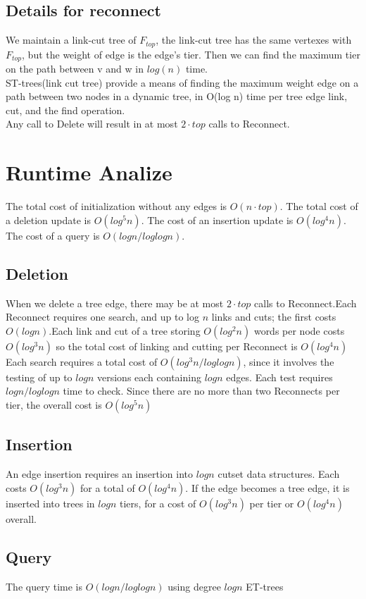 \documentclass[conference,compsoc]{IEEEtran}
\begin{document}
\subsection{Details for reconnect}
We maintain a link-cut tree of $F_{top}$, the link-cut tree has the same vertexes with $F_{top}$, but the weight of edge is the edge's tier.
Then we can find the maximum tier on the path between v and w in $log(n)$ time.\\
ST-trees(link cut tree) provide a means of finding the maximum weight edge on a path between two nodes in a dynamic tree, in O(log n) time per tree edge link, cut, and the find operation.\\
Any call to Delete will result in at most $2 · top$ calls to Reconnect.
\section{Runtime Analize}
The total cost of initialization without any edges is $O(n· top)$. The total cost of a deletion update is $O(log^5 n)$. The cost of an insertion update is $O(log^4 n)$. The cost of a query is $O(log n/ log log n)$.\\
\subsection{Deletion}
When we delete a tree edge, there may be at most $2 · top$ calls to Reconnect.Each Reconnect requires one search, and up to log $n$ links and cuts; the first costs $O(log n)$.Each link and cut of a tree storing $O(log^2 n)$ words per node costs $O(log^3 n)$ so the total cost of linking and cutting per Reconnect is $O(log^4 n)$\\
Each search requires a total cost of $O(log^3 n/ log log n)$, since it involves the testing of up to $log n$ versions each containing
$log n$ edges. Each test requires $log n/ log log n$ time to check. Since there are no more than two Reconnects per tier, the overall cost is $O(log^5 n)$
\subsection{Insertion}
An edge insertion requires an insertion into $log n$ cutset
data structures. Each costs $O(log^3 n)$ for a total of
$O(log^4 n)$. If the edge becomes a tree edge, it is inserted
into trees in $log n$ tiers, for a cost of $O(log^3 n)$ per tier
or $O(log^4 n)$ overall.
\subsection{Query}
The query time is $O(log n/ log log n)$ using degree $log n$ ET-trees
\end{document}
